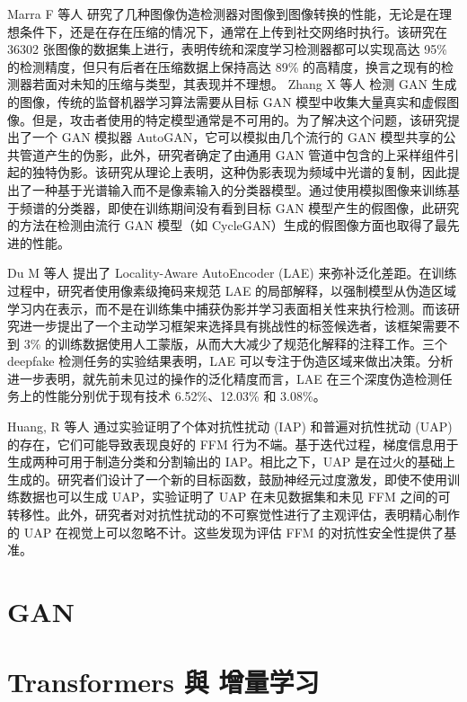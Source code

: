Marra F 等人 \cite{marra2018detection} 研究了几种图像伪造检测器对图像到图像转换的性能，无论是在理想条件下，还是在存在压缩的情况下，通常在上传到社交网络时执行。该研究在 36302 张图像的数据集上进行，表明传统和深度学习检测器都可以实现高达 95\% 的检测精度，但只有后者在压缩数据上保持高达 89\% 的高精度，换言之现有的检测器若面对未知的压缩与类型，其表现并不理想。
Zhang X 等人 \cite{zhang2019detecting} 检测 GAN 生成的图像，传统的监督机器学习算法需要从目标 GAN 模型中收集大量真实和虚假图像。但是，攻击者使用的特定模型通常是不可用的。为了解决这个问题，该研究提出了一个 GAN 模拟器 AutoGAN，它可以模拟由几个流行的 GAN 模型共享的公共管道产生的伪影，此外，研究者确定了由通用 GAN 管道中包含的上采样组件引起的独特伪影。该研究从理论上表明，这种伪影表现为频域中光谱的复制，因此提出了一种基于光谱输入而不是像素输入的分类器模型。通过使用模拟图像来训练基于频谱的分类器，即使在训练期间没有看到目标 GAN 模型产生的假图像，此研究的方法在检测由流行 GAN 模型（如 CycleGAN）生成的假图像方面也取得了最先进的性能。

Du M 等人 \cite{du2019towards} 提出了 Locality-Aware AutoEncoder (LAE) 来弥补泛化差距。在训练过程中，研究者使用像素级掩码来规范 LAE 的局部解释，以强制模型从伪造区域学习内在表示，而不是在训练集中捕获伪影并学习表面相关性来执行检测。而该研究进一步提出了一个主动学习框架来选择具有挑战性的标签候选者，该框架需要不到 3\% 的训练数据使用人工蒙版，从而大大减少了规范化解释的注释工作。三个 deepfake 检测任务的实验结果表明，LAE 可以专注于伪造区域来做出决策。分析进一步表明，就先前未见过的操作的泛化精度而言，LAE 在三个深度伪造检测任务上的性能分别优于现有技术 6.52\%、12.03\% 和 3.08\%。

Huang, R 等人 \cite{huang2020security} 通过实验证明了个体对抗性扰动 (IAP) 和普遍对抗性扰动 (UAP) 的存在，它们可能导致表现良好的 FFM 行为不端。基于迭代过程，梯度信息用于生成两种可用于制造分类和分割输出的 IAP。相比之下，UAP 是在过火的基础上生成的。研究者们设计了一个新的目标函数，鼓励神经元过度激发，即使不使用训练数据也可以生成 UAP，实验证明了 UAP 在未见数据集和未见 FFM 之间的可转移性。此外，研究者对对抗性扰动的不可察觉性进行了主观评估，表明精心制作的 UAP 在视觉上可以忽略不计。这些发现为评估 FFM 的对抗性安全性提供了基准。

\section{GAN}

\section{Transformers 與 增量学习}



